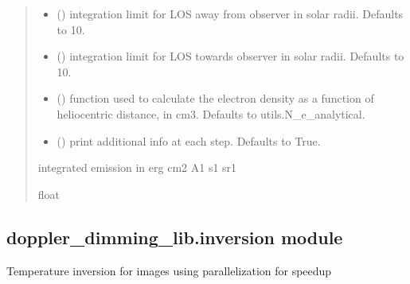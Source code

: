 \documentclass[letterpaper,10pt,english]{sphinxmanual}
\begin{document}
\begin{fulllineitems}
\begin{quote}
\begin{description}
\begin{itemize}
\item {} 
\sphinxAtStartPar
{} (\sphinxstyleliteralemphasis{\sphinxupquote{, }}) \textendash{} integration limit for LOS away from observer in solar radii. Defaults to 10.

\item {} 
\sphinxAtStartPar
{} (\sphinxstyleliteralemphasis{\sphinxupquote{, }}) \textendash{} integration limit for LOS towards observer in solar radii. Defaults to 10.

\item {} 
\sphinxAtStartPar
{} (\sphinxstyleliteralemphasis{\sphinxupquote{, }}) \textendash{} function used to calculate the electron density as a function of heliocentric distance, in cm\sphinxhyphen{}3. Defaults to utils.N\_e\_analytical.

\item {} 
\sphinxAtStartPar
{} (\sphinxstyleliteralemphasis{\sphinxupquote{, }}) \textendash{} print additional info at each step. Defaults to True.

\end{itemize}

\sphinxAtStartPar
integrated emission in erg cm\sphinxhyphen{}2 A\sphinxhyphen{}1 s\sphinxhyphen{}1 sr\sphinxhyphen{}1

\sphinxAtStartPar
float

\end{description}\end{quote}

\end{fulllineitems}



\subsection{doppler\_dimming\_lib.inversion module}
\label{\detokenize{doppler_dimming_lib:module-doppler_dimming_lib.inversion}}\label{\detokenize{doppler_dimming_lib:doppler-dimming-lib-inversion-module}}
\sphinxAtStartPar
Temperature inversion for images using parallelization for speedup
\end{document}
